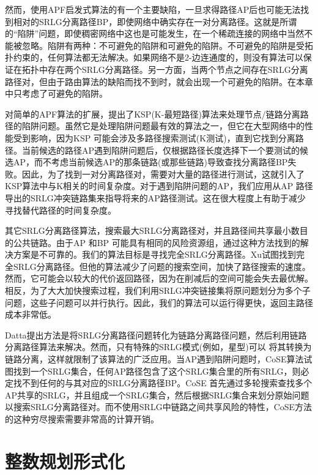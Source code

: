 然而，使用APF启发式算法的有一个主要缺陷，一旦求得路径AP后也可能无法找到相对的SRLG分离路径BP，即使网络中确实存在一对分离路径。这就是所谓的“陷阱”问题，即使稠密网络中\cite{laborczi2001solving}这也是可能发生，在一个稀疏连接的网络中当然不能被忽略。陷阱有两种：不可避免的陷阱和可避免的陷阱。不可避免的陷阱是受拓扑约束的，任何算法都无法解决。如果网络不是2-边连通度的，则没有算法可以保证在拓扑中存在两个SRLG分离路径。另一方面，当两个节点之间存在SRLG分离路径对，但由于路由算法的缺陷而找不到时，就会出现一个可避免的陷阱。在本章中只考虑了可避免的陷阱。

对简单的APF算法的扩展，提出了KSP(K-最短路径)算法来处理节点/链路分离路径的陷阱问题。虽然它是处理陷阱问题最有效的算法之一，但它在大型网络中的性能受到影响，因为KSP 可能会涉及多路径搜索测试(K测试)，直到它找到分离路径。当前候选的路径AP遇到陷阱问题后，仅根据路径长度选择下一个要测试的候选AP，而不考虑当前候选AP的那条链路(或那些链路)导致查找分离路径BP失败。因此，为了找到一对分离路径对，需要对大量的路径进行测试，这就引入了KSP算法中与K相关的时间复杂度。对于遇到陷阱问题的AP，我们应用从AP 路径导出的SRLG冲突链路集来指导将来的AP路径测试。这在很大程度上有助于减少寻找替代路径的时间复杂度。

其它SRLG分离路径算法\cite{rostami2012msdp,rostami2007cose,datta2008graph,xu2003new,todimala2004imsh}，搜索最大SRLG分离路径对，并且路径间共享最小数目的公共链路。由于AP 和BP 可能具有相同的风险资源组，通过这种方法找到的解决方案是不可靠的。我们的算法目标是寻找完全SRLG分离路径。Xu\cite{xu2003trap}试图找到完全SRLG分离路径。但他的算法减少了问题的搜索空间，加快了路径搜索的速度。然而，它可能会以较大的代价返回路径，因为在削减后的空间可能会失去最优解。相反，为了大大加快搜索过程，我们利用SRLG冲突链接集将原问题划分为多个子问题，这些子问题可以并行执行。因此，我们的算法可以运行得更快，返回主路径成本非常低。

Datta\cite{datta2008graph}提出方法是将SRLG分离路径问题转化为链路分离路径问题，然后利用链路分离路径算法来解决。然而，只有特殊的SRLG模式(例如，星型)可以
将其转换为链路分离，这样就限制了该算法的广泛应用。当AP遇到陷阱问题时，CoSE\cite{rostami2007cose}算法试图找到一个SRLG集合，任何AP路径包含了这个SRLG集合里的所有SRLG，则必定找不到任何的与其对应的SRLG分离路径BP。CoSE 首先通过多轮搜索查找多个AP共享的SRLG，并且组成一个SRLG集合，然后根据SRLG集合来划分原始问题以搜索SRLG分离路径对。而不使用SRLG中链路之间共享风险的特性，CoSE方法的这种穷尽搜索需要非常高的计算开销。



\section{整数规划形式化}
